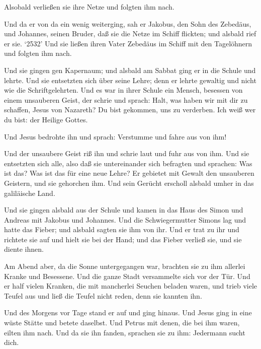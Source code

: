  Alsobald verließen sie ihre Netze und folgten ihm nach.

 Und da er von da ein wenig weiterging, sah er Jakobus, den
Sohn des Zebedäus, und Johannes, seinen Bruder, daß sie die Netze im
Schiff flickten; und alsbald rief er sie.  `2532' Und sie
ließen ihren Vater Zebedäus im Schiff mit den Tagelöhnern und folgten
ihm nach.

 Und sie gingen gen Kapernaum; und alsbald am Sabbat ging
er in die Schule und lehrte.  Und sie entsetzten sich über
seine Lehre; denn er lehrte gewaltig und nicht wie die Schriftgelehrten.
 Und es war in ihrer Schule ein Mensch, besessen von einem
unsauberen Geist, der schrie  und sprach: Halt, was haben
wir mit dir zu schaffen, Jesus von Nazareth? Du bist gekommen, uns zu
verderben. Ich weiß wer du bist: der Heilige Gottes.

 Und Jesus bedrohte ihn und sprach: Verstumme und fahre aus
von ihm!

 Und der unsaubere Geist riß ihn und schrie laut und fuhr
aus von ihm.  Und sie entsetzten sich alle, also daß sie
untereinander sich befragten und sprachen: Was ist das? Was ist das für
eine neue Lehre? Er gebietet mit Gewalt den unsauberen Geistern, und sie
gehorchen ihm.  Und sein Gerücht erscholl alsbald umher in
das galiläische Land.

 Und sie gingen alsbald aus der Schule und kamen in das
Haus des Simon und Andreas mit Jakobus und Johannes.  Und
die Schwiegermutter Simons lag und hatte das Fieber; und alsbald sagten
sie ihm von ihr.  Und er trat zu ihr und richtete sie auf
und hielt sie bei der Hand; und das Fieber verließ sie, und sie diente
ihnen.

 Am Abend aber, da die Sonne untergegangen war, brachten
sie zu ihm allerlei Kranke und Besessene.  Und die ganze
Stadt versammelte sich vor der Tür.  Und er half vielen
Kranken, die mit mancherlei Seuchen beladen waren, und trieb viele
Teufel aus und ließ die Teufel nicht reden, denn sie kannten ihn.

 Und des Morgens vor Tage stand er auf und ging hinaus. Und
Jesus ging in eine wüste Stätte und betete daselbst.  Und
Petrus mit denen, die bei ihm waren, eilten ihm nach.  Und
da sie ihn fanden, sprachen sie zu ihm: Jedermann sucht dich.

